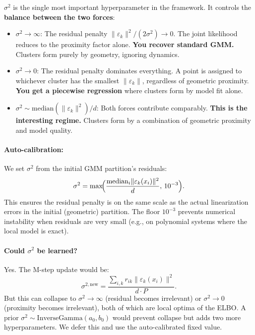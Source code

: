 \documentclass[11pt]{article}
\theoremstyle{definition}
\theoremstyle{plain}
\theoremstyle{remark}
\begin{document}
$\sigma^2$ is the single most important hyperparameter in the framework. It controls the \textbf{balance between the two forces}:

\begin{itemize}[leftmargin=*,itemsep=4pt]
  \item $\sigma^2\to\infty$: The residual penalty $\|\varepsilon_k\|^2/(2\sigma^2)\to 0$. The joint likelihood reduces to the proximity factor alone. \textbf{You recover standard GMM.} Clusters form purely by geometry, ignoring dynamics.

  \item $\sigma^2\to 0$: The residual penalty dominates everything. A point is assigned to whichever cluster has the smallest $\|\varepsilon_k\|$, regardless of geometric proximity. \textbf{You get a piecewise regression} where clusters form by model fit alone.

  \item $\sigma^2\sim\text{median}(\|\varepsilon_k\|^2)/d$: Both forces contribute comparably. \textbf{This is the interesting regime.} Clusters form by a combination of geometric proximity and model quality.
\end{itemize}

\paragraph{Auto-calibration:} We set $\sigma^2$ from the initial GMM partition's residuals:
\begin{equation}
  \sigma^2 = \max\!\Bigl(\frac{\text{median}_i\|\varepsilon_k(x_i)\|^2}{d},\,10^{-3}\Bigr).
\end{equation}
This ensures the residual penalty is on the same scale as the actual linearization errors in the initial (geometric) partition. The floor $10^{-3}$ prevents numerical instability when residuals are very small (e.g., on polynomial systems where the local model is exact).

\paragraph{Could $\sigma^2$ be learned?} Yes. The M-step update would be:
\begin{equation}
  \sigma^{2,\mathrm{new}} = \frac{\sum_{i,k} r_{ik}\|\varepsilon_k(x_i)\|^2}{d\cdot P}.
\end{equation}
But this can collapse to $\sigma^2\to\infty$ (residual becomes irrelevant) or $\sigma^2\to 0$ (proximity becomes irrelevant), both of which are local optima of the ELBO. A prior $\sigma^2\sim\mathrm{InverseGamma}(a_0,b_0)$ would prevent collapse but adds two more hyperparameters. We defer this and use the auto-calibrated fixed value.
\end{document}
